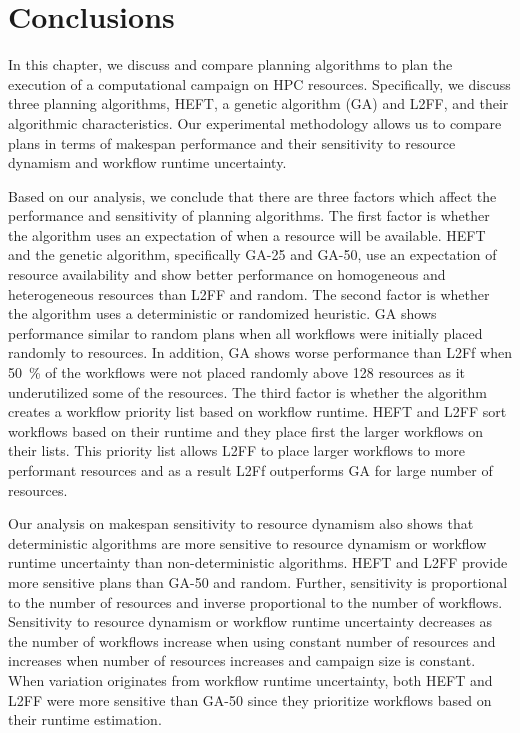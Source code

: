 \section{Conclusions}
\label{sec:cf_algo_sel}
In this chapter, we discuss and compare planning algorithms to plan the execution of a computational campaign on HPC resources.
Specifically, we discuss three planning algorithms, HEFT, a genetic algorithm (GA) and L2FF, and their algorithmic characteristics.
Our experimental methodology allows us to compare plans in terms of makespan performance and their sensitivity to resource dynamism and workflow runtime uncertainty.

Based on our analysis, we conclude that there are three factors which affect the performance and sensitivity of planning algorithms.
The first factor is whether the algorithm uses an expectation of when a resource will be available.
HEFT and the genetic algorithm, specifically GA-25 and GA-50, use an expectation of resource availability and show better performance on homogeneous and heterogeneous resources than L2FF and random.
The second factor is whether the algorithm uses a deterministic or randomized heuristic.
GA shows performance similar to random plans when all workflows were initially placed randomly to resources.
In addition, GA shows worse performance than L2Ff when 50~\% of the workflows were not placed randomly above 128 resources as it underutilized some of the resources.
The third factor is whether the algorithm creates a workflow priority list based on workflow runtime.
HEFT and L2FF sort workflows based on their runtime and they place first the larger workflows on their lists.
This priority list allows L2FF to place larger workflows to more performant resources and as a result L2Ff outperforms GA for large number of resources.

Our analysis on makespan sensitivity to resource dynamism also shows that deterministic algorithms are more sensitive to resource dynamism or workflow runtime uncertainty than non-deterministic algorithms.
HEFT and L2FF provide more sensitive plans than GA-50 and random.
Further, sensitivity is proportional to the number of resources and inverse proportional to the number of workflows.
Sensitivity to resource dynamism or workflow runtime uncertainty decreases as the number of workflows increase when using constant number of resources and increases when number of resources increases and campaign size is constant.
When variation originates from workflow runtime uncertainty, both HEFT and L2FF were more sensitive than GA-50 since they prioritize workflows based on their runtime estimation.

